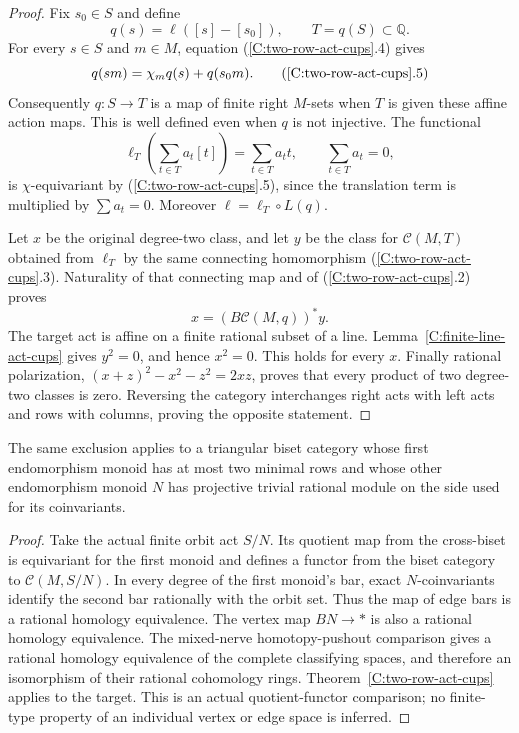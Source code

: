 \begin{proof}
Fix $s_0\in S$ and define
\[
 q(s)=\ell([s]-[s_0]),\qquad T=q(S)\subset\mathbb Q.
\]
For every $s\in S$ and $m\in M$, equation
(\ref{C:two-row-act-cups}.4) gives
\[
 q(sm)=\chi_m q(s)+q(s_0m).                           \tag{\ref{C:two-row-act-cups}.5}
\]
Consequently $q:S\to T$ is a map of finite right $M$-sets when
$T$ is given these affine action maps.  This is well defined even
when $q$ is not injective.  The functional
\[
 \ell_T\left(\sum_{t\in T}a_t[t]\right)
       =\sum_{t\in T}a_t t,
 \qquad \sum_{t\in T}a_t=0,
\]
is $\chi$-equivariant by (\ref{C:two-row-act-cups}.5), since the
translation term is multiplied by $\sum a_t=0$.
Moreover $\ell=\ell_T\circ L(q)$.

Let $x$ be the original degree-two class, and let $y$ be the
class for $\mathcal C(M,T)$ obtained from $\ell_T$ by the same
connecting homomorphism (\ref{C:two-row-act-cups}.3).
Naturality of that connecting map and of
(\ref{C:two-row-act-cups}.2) proves
\[
 x=(B\mathcal C(M,q))^*y.
\]
The target act is affine on a finite rational subset of a line.
Lemma~\ref{C:finite-line-act-cups} gives $y^2=0$, and hence $x^2=0$.
This holds for every $x$.  Finally rational polarization,
$(x+z)^2-x^2-z^2=2xz$, proves that every product of two degree-two
classes is zero.  Reversing the category interchanges right acts
with left acts and rows with columns, proving the opposite statement.
\end{proof}

\begin{corollary}\label{C:two-row-biset-cups}
The same exclusion applies to a triangular biset category whose
first endomorphism monoid has at most two minimal rows and whose
other endomorphism monoid $N$ has projective trivial rational module
on the side used for its coinvariants.
\end{corollary}
\begin{proof}
Take the actual finite orbit act $S/N$.  Its quotient map from the
cross-biset is equivariant for the first monoid and defines a functor
from the biset category to $\mathcal C(M,S/N)$.  In every degree of
the first monoid's bar, exact $N$-coinvariants identify the second
bar rationally with the orbit set.  Thus the map of edge bars is a
rational homology equivalence.  The vertex map $BN\to *$ is also
a rational homology equivalence.  The mixed-nerve homotopy-pushout
comparison gives a rational homology equivalence of the complete
classifying spaces, and therefore an isomorphism of their rational
cohomology rings.  Theorem~\ref{C:two-row-act-cups} applies to the
target.  This is an actual quotient-functor comparison; no finite-type
property of an individual vertex or edge space is inferred.
\end{proof}
